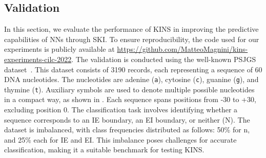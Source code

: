 \subsection{Validation}\label{subsec:kins-validation}
%

%
In this section, we evaluate the performance of \gls{KINS} in improving the predictive capabilities of \glspl{NN} through \gls{SKI}.
%
To ensure reproducibility, the code used for our experiments is publicly available at \url{https://github.com/MatteoMagnini/kins-experiments-cilc-2022}.
%
The validation is conducted using the well-known \gls{PSJGS} dataset~\cite{splice-junction_gene_sequences_69}.
%
This dataset consists of 3190 records, each representing a sequence of 60 DNA nucleotides.
%
The nucleotides are adenine (\texttt{a}), cytosine (\texttt{c}), guanine (\texttt{g}), and thymine (\texttt{t}).
%
Auxiliary symbols are used to denote multiple possible nucleotides in a compact way, as shown in .
%
Each sequence spans positions from -30 to +30, excluding position 0.
%
The classification task involves identifying whether a sequence corresponds to an \gls{IE} boundary, an \gls{EI} boundary, or neither (N).
%
The dataset is imbalanced, with class frequencies distributed as follows: 50\% for \gls{n}, and 25\% each for \gls{IE} and \gls{EI}.
%
This imbalance poses challenges for accurate classification, making it a suitable benchmark for testing \gls{KINS}.


